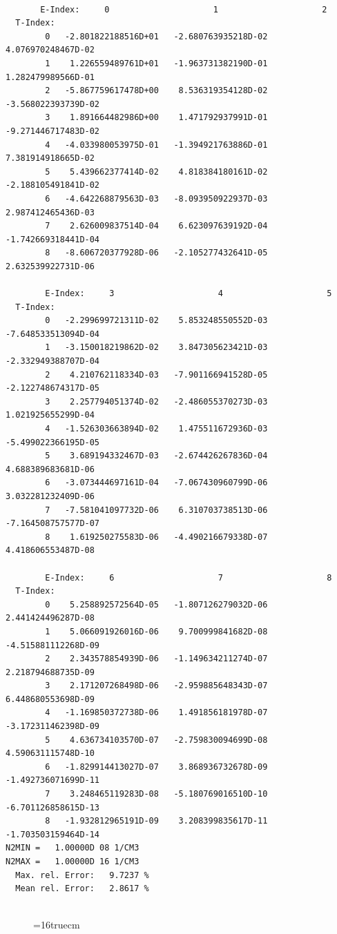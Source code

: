 \documentclass[12pt,dvipdfmx]{article}
\begin{document}
\begin{small}\begin{verbatim}

       E-Index:     0                     1                     2
  T-Index:
        0   -2.801822188516D+01   -2.680763935218D-02    4.076970248467D-02
        1    1.226559489761D+01   -1.963731382190D-01    1.282479989566D-01
        2   -5.867759617478D+00    8.536319354128D-02   -3.568022393739D-02
        3    1.891664482986D+00    1.471792937991D-01   -9.271446717483D-02
        4   -4.033980053975D-01   -1.394921763886D-01    7.381914918665D-02
        5    5.439662377414D-02    4.818384180161D-02   -2.188105491841D-02
        6   -4.642268879563D-03   -8.093950922937D-03    2.987412465436D-03
        7    2.626009837514D-04    6.623097639192D-04   -1.742669318441D-04
        8   -8.606720377928D-06   -2.105277432641D-05    2.632539922731D-06

        E-Index:     3                     4                     5
  T-Index:
        0   -2.299699721311D-02    5.853248550552D-03   -7.648533513094D-04
        1   -3.150018219862D-02    3.847305623421D-03   -2.332949388707D-04
        2    4.210762118334D-03   -7.901166941528D-05   -2.122748674317D-05
        3    2.257794051374D-02   -2.486055370273D-03    1.021925655299D-04
        4   -1.526303663894D-02    1.475511672936D-03   -5.499022366195D-05
        5    3.689194332467D-03   -2.674426267836D-04    4.688389683681D-06
        6   -3.073444697161D-04   -7.067430960799D-06    3.032281232409D-06
        7   -7.581041097732D-06    6.310703738513D-06   -7.164508757577D-07
        8    1.619250275583D-06   -4.490216679338D-07    4.418606553487D-08

        E-Index:     6                     7                     8
  T-Index:
        0    5.258892572564D-05   -1.807126279032D-06    2.441424496287D-08
        1    5.066091926016D-06    9.700999841682D-08   -4.515881112268D-09
        2    2.343578854939D-06   -1.149634211274D-07    2.218794688735D-09
        3    2.171207268498D-06   -2.959885648343D-07    6.448680553698D-09
        4   -1.169850372738D-06    1.491856181978D-07   -3.172311462398D-09
        5    4.636734103570D-07   -2.759830094699D-08    4.590631115748D-10
        6   -1.829914413027D-07    3.868936732678D-09   -1.492736071699D-11
        7    3.248465119283D-08   -5.180769016510D-10   -6.701126858615D-13
        8   -1.932812965191D-09    3.208399835617D-11   -1.703503159464D-14
N2MIN =   1.00000D 08 1/CM3
N2MAX =   1.00000D 16 1/CM3
  Max. rel. Error:   9.7237 %
  Mean rel. Error:   2.8617 %


\end{verbatim}\end{small}
\begin{figure} \label{2.2.h2r}
\epsfxsize=16truecm
\end{figure}
\newpage
\end{document}
